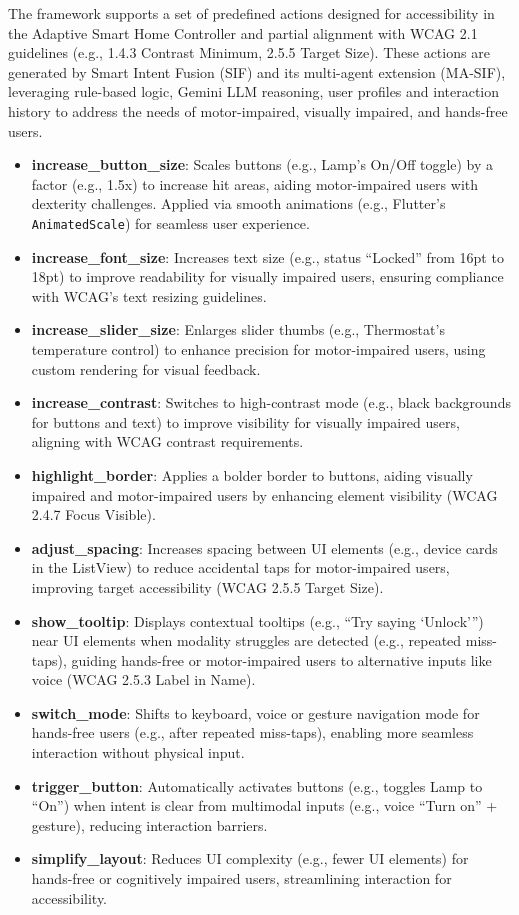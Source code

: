 \documentclass[openany]{book}
\begin{document}
The framework supports a set of predefined actions designed for accessibility in the Adaptive Smart Home Controller and partial alignment with WCAG 2.1 guidelines (e.g., 1.4.3 Contrast Minimum, 2.5.5 Target Size). These actions are generated by Smart Intent Fusion (SIF) and its multi-agent extension (MA-SIF), leveraging rule-based logic, Gemini LLM reasoning, user profiles and interaction history to address the needs of motor-impaired, visually impaired, and hands-free users.
\begin{itemize}
    \item \textbf{increase\_button\_size}: Scales buttons (e.g., Lamp’s On/Off toggle) by a factor (e.g., 1.5x) to increase hit areas, aiding motor-impaired users with dexterity challenges. Applied via smooth animations (e.g., Flutter’s \texttt{AnimatedScale}) for seamless user experience.
    \item \textbf{increase\_font\_size}: Increases text size (e.g., status “Locked” from 16pt to 18pt) to improve readability for visually impaired users, ensuring compliance with WCAG’s text resizing guidelines.
    \item \textbf{increase\_slider\_size}: Enlarges slider thumbs (e.g., Thermostat’s temperature control) to enhance precision for motor-impaired users, using custom rendering for visual feedback.
    \item \textbf{increase\_contrast}: Switches to high-contrast mode (e.g., black backgrounds for buttons and text) to improve visibility for visually impaired users, aligning with WCAG contrast requirements.
    \item \textbf{highlight\_border}: Applies a bolder border to buttons, aiding visually impaired and motor-impaired users by enhancing element visibility (WCAG 2.4.7 Focus Visible).
    \item \textbf{adjust\_spacing}: Increases spacing between UI elements (e.g., device cards in the ListView) to reduce accidental taps for motor-impaired users, improving target accessibility (WCAG 2.5.5 Target Size).
    \item \textbf{show\_tooltip}: Displays contextual tooltips (e.g., “Try saying ‘Unlock’”) near UI elements when modality struggles are detected (e.g., repeated miss-taps), guiding hands-free or motor-impaired users to alternative inputs like voice (WCAG 2.5.3 Label in Name).
    \item \textbf{switch\_mode}: Shifts to keyboard, voice or gesture navigation mode for hands-free users (e.g., after repeated miss-taps), enabling more seamless interaction without physical input.
    \item \textbf{trigger\_button}: Automatically activates buttons (e.g., toggles Lamp to “On”) when intent is clear from multimodal inputs (e.g., voice “Turn on” + gesture), reducing interaction barriers.
    \item \textbf{simplify\_layout}: Reduces UI complexity (e.g., fewer UI elements) for hands-free or cognitively impaired users, streamlining interaction for accessibility.
\end{itemize}
\end{document}
